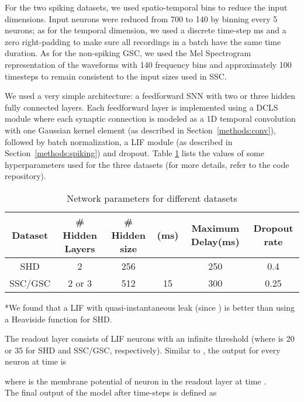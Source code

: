 \documentclass{article} \usepackage{iclr2024_conference,times}
\begin{document}
For the two spiking datasets, we used spatio-temporal bins to reduce the input dimensions. 
Input neurons were reduced from 700 to 140 by binning every 5 neurons; as for the temporal dimension, we used a discrete time-step  ms and a zero right-padding to make sure all recordings in a batch have the same time duration. As for the non-spiking GSC, we used the Mel Spectrogram representation of the waveforms with 140 frequency bins and approximately 100 timesteps to remain consistent to the input sizes used in SSC.



We used a very simple architecture: a feedforward SNN with two or three hidden fully connected layers. Each feedforward layer is implemented using a DCLS module where each synaptic connection is modeled as a 1D temporal convolution with one Gaussian kernel element (as described in Section~\ref{methods:conv}), followed by batch normalization, a LIF module (as described in Section~\ref{methods:spiking}) and dropout. Table \ref{NetworkParams} lists the values of some hyperparameters used for the three datasets (for more details, refer to the code repository). 

\begin{table}[ht]
    \caption{Network parameters for different datasets}
    \label{NetworkParams}
    \centering
    \begin{tabular}{cccccc}
        \toprule
            Dataset  & \# Hidden Layers & \# Hidden size & (ms) &Maximum Delay(ms) & Dropout rate  \\
        \midrule
            SHD & 2 & 256 &    & 250 & 0.4\\
            SSC/GSC & 2 or 3 & 512 & 15 & 300 & 0.25\\
        \bottomrule
  \end{tabular}
{\raggedright\footnotesize
*We found that a LIF with quasi-instantaneous leak  (since  ) is better than using a Heaviside function for SHD. \par}
  \vspace{1ex}
\end{table}
   

The readout layer consists of  LIF neurons with an infinite threshold (where  is 20 or 35 for SHD and SSC/GSC, respectively). Similar to \citet{baseline}, the output  for every neuron  at time  is

where  is the membrane potential of neuron  in the readout layer  at time .\\
The final output of the model after  time-steps is defined as
\end{document}
